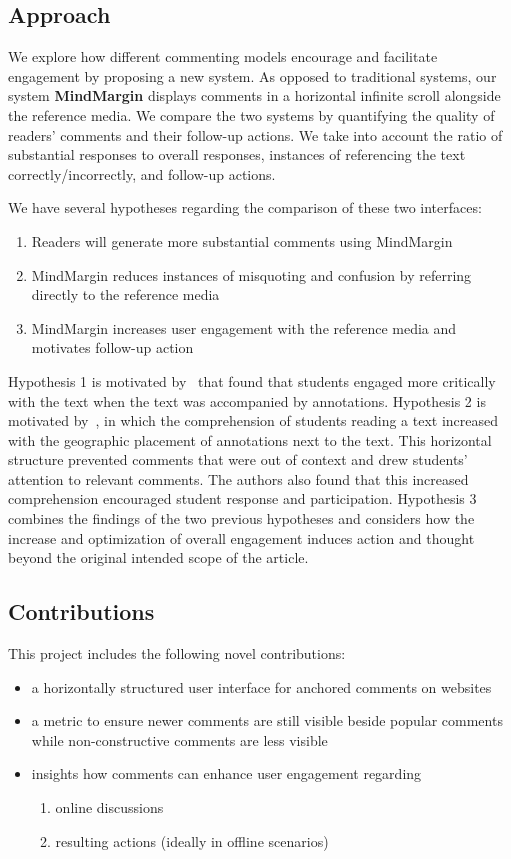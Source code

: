 \subsection{Approach}

We explore how different commenting models encourage and facilitate engagement by proposing a new system. As opposed to traditional systems, our system \textbf{MindMargin} displays comments in a horizontal infinite scroll alongside the reference media. We compare the two systems by quantifying the quality of readers' comments and their follow-up actions. We take into account the ratio of substantial responses to overall responses, instances of referencing the text correctly/incorrectly, and follow-up actions.

We have several hypotheses regarding the comparison of these two interfaces:
\begin{enumerate}
\item Readers will generate more substantial comments using MindMargin
\item MindMargin reduces instances of misquoting and confusion by referring directly to the reference media
\item MindMargin increases user engagement with the reference media and motivates follow-up action
\end{enumerate}

Hypothesis 1 is motivated by~\cite{AnnotationsStudents} that found that students engaged more critically with the text when the text was accompanied by annotations. 
Hypothesis 2 is motivated by~\cite{NB}, in which the comprehension of students reading a text increased with the geographic placement of annotations next to the text. This horizontal structure prevented comments that were out of context and drew students' attention to relevant comments. The authors also found that this increased comprehension encouraged student response and participation.
Hypothesis 3 combines the findings of the two previous hypotheses and considers how the increase and optimization of overall engagement induces action and thought beyond the original intended scope of the article. 

\subsection{Contributions}

This project includes the following novel contributions:

\begin{itemize}
\item a horizontally structured user interface for anchored comments on websites
\item a metric to ensure newer comments are still visible beside popular comments while non-constructive comments are less visible
\item insights how comments can enhance user engagement regarding
\begin{enumerate}
\item online discussions
\item resulting actions (ideally in offline scenarios)
\end{enumerate}

\end{itemize}